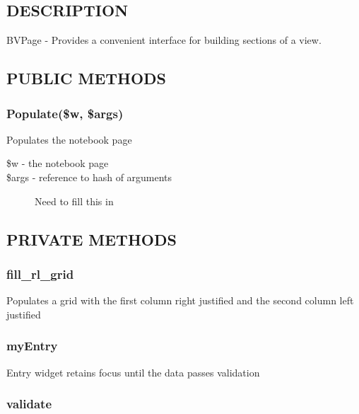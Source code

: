 \documentclass{article}
\begin{document}
\subsection*{DESCRIPTION\label{BVPage_DESCRIPTION}}


BVPage - Provides a convenient interface for building sections of a view.

\subsection*{PUBLIC METHODS\label{BVPage_PUBLIC_METHODS}}
\subsubsection*{Populate(\$w, \$args)\label{BVPage_Populate_w_args_}}


Populates the notebook page

\begin{description}

\item[{\$w - the notebook page}] \mbox{}
\item[{\$args - reference to hash of arguments}] \mbox{}

Need to fill this in

\end{description}
\subsection*{PRIVATE METHODS\label{BVPage_PRIVATE_METHODS}}
\subsubsection*{fill\_rl\_grid\label{BVPage_fill_rl_grid}}


Populates a grid with the first column right justified and the second column
left justified

\subsubsection*{myEntry\label{BVPage_myEntry}}


Entry widget retains focus until the data passes validation

\subsubsection*{validate\label{BVPage_validate}}
\end{document}

